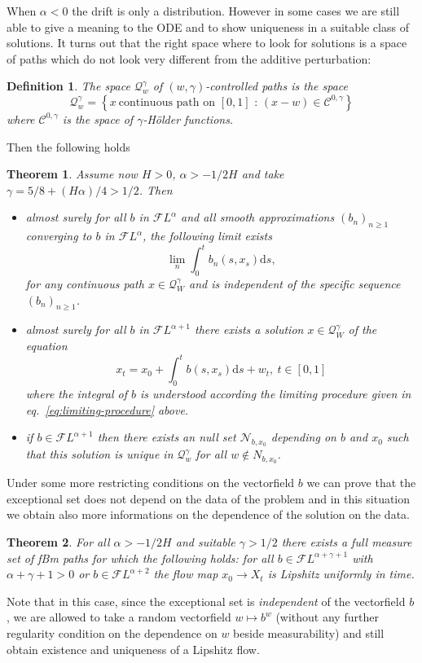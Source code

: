 \documentclass[11pt,a4paper,draft,reqno]{amsart}
\newtheorem{definition}{Definition}
\newtheorem{theorem}{Theorem}
\theoremstyle{definition}
\newcommand{\cF}{\mathcal{F}}
\newcommand{\dd}{\mathrm{d}}
\newcommand{\cQ}{\mathcal{Q}}
\newcommand{\cC}{\mathcal{C}}
\begin{document}
\bigskip
When $\alpha < 0$ the drift is only a distribution. However in some cases we are still able to give a meaning to the ODE and to show uniqueness in a suitable class of solutions. It turns out that the right space where to look for solutions is a space of paths which do not look very different from the additive perturbation:
\begin{definition}
The space $\cQ^{\gamma}_w$ of $(w,\gamma)$-controlled paths is the space
$$\cQ^{\gamma}_w= \left\{x\ \textrm{continuous path on $[0,1]$ : } (x-w)\in\cC^{0,\gamma}\right\}$$
where $\cC^{0,\gamma}$ is the space of $\gamma$-H\"older functions.
\end{definition}
 Then the following holds
\begin{theorem}\label{eq:fbm-theorem-2}
Assume now $H>0$, $\alpha >-1/2H$ and take $\gamma = 5/8+(H\alpha)/4 > 1/2$. Then 
\begin{itemize}
\item[i)]
almost surely for all $b$ in $\cF L^\alpha$  and all  smooth approximations $(b_n)_{n\ge 1}$ converging to $b$ in $\cF L^\alpha$, the following limit exists
\begin{equation}
\label{eq:limiting-procedure}
  \lim_n  \int_{0}^t b_n(s,x_s)\dd s ,
\end{equation}
for any continuous path $x\in\cQ^\gamma_W$ and is independent of the specific sequence $(b_n)_{n\ge 1}$. 
\item[ii)]almost surely for all $b$ in $\cF L^{\alpha+1}$ there exists a solution $x\in\cQ^\gamma_W$ of the equation
$$
x_t= x_0 + \int_{0}^t b(s,x_s)\dd s + w_t,\ t\in[0,1]
$$
where the integral of $b$ is understood according the limiting procedure given in eq.~\eqref{eq:limiting-procedure} above.
\item[iii)] if $b \in \cF L^{\alpha+1}$ then there exists an null set $\mathcal N_{b,x_0}$ depending on $b$ and $x_0$ such that this solution is unique in $\cQ^\gamma_w$ for all $w\not\in N_{b,x_0}$. 
\end{itemize}
\end{theorem}

Under some more restricting conditions on the vectorfield $b$ we can prove that the exceptional set does not depend on the data of the problem and in this situation we obtain also more informations on the dependence of the solution on the data. 
\begin{theorem}
For all $\alpha > -1/2H$ and suitable $\gamma>1/2$ there exists a full measure set of fBm paths for which the following holds: for all $b\in \cF L^{\alpha+\gamma+1}$ with $\alpha+\gamma+1>0$ or $b\in \cF L^{\alpha+2}$ the flow map $x_0 \to X_t$ is Lipshitz uniformly in time.
\end{theorem}
Note that in this case, since the exceptional set  is \emph{independent} of the vectorfield $b$, we are allowed to take a random vectorfield $w \mapsto b^w$ (without any further regularity condition on the dependence on $w$ beside measurability) and still obtain existence and uniqueness of a Lipshitz flow. 
\end{document}
